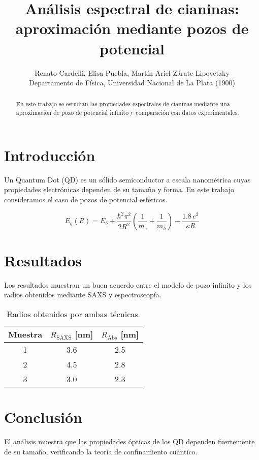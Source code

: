 \documentclass[10pt,a4paper,twocolumn]{article}
\begin{document}
\title{\bfseries Análisis espectral de cianinas: aproximación mediante pozos de potencial}
\author{Renato Cardelli, Elisa Puebla, Martín Ariel Zárate Lipovetzky \\ 
\small Departamento de Física, Universidad Nacional de La Plata (1900)}
\date{} %
\maketitle

\begin{abstract}
En este trabajo se estudian las propiedades espectrales de cianinas mediante una aproximación de pozo de potencial infinito y comparación con datos experimentales. 
\end{abstract}

\section{Introducción}
Un Quantum Dot (QD) es un sólido semiconductor a escala nanométrica cuyas propiedades electrónicas dependen de su tamaño y forma. 
En este trabajo consideramos el caso de pozos de potencial esféricos. 

\begin{equation}
    E_g(R) = E_b + \frac{\hbar^2 \pi^2}{2 R^2} \left( \frac{1}{m_e} + \frac{1}{m_h} \right) - \frac{1.8 \, e^2}{\kappa R}
\end{equation}


\section{Resultados}
Los resultados muestran un buen acuerdo entre el modelo de pozo infinito y los radios obtenidos mediante SAXS y espectroscopía.

\begin{table}[H]
\centering
\begin{tabular}{ccc}
\toprule
Muestra & $R_{\text{SAXS}}$ [nm] & $R_{\text{Abs}}$ [nm] \\
\midrule
1 & 3.6 & 2.5 \\
2 & 4.5 & 2.8 \\
3 & 3.0 & 2.3 \\
\bottomrule
\end{tabular}
\caption{Radios obtenidos por ambas técnicas.}
\label{tab:radios}
\end{table}

\section{Conclusión}
El análisis muestra que las propiedades ópticas de los QD dependen fuertemente de su tamaño, verificando la teoría de confinamiento cuántico.

\end{document}
